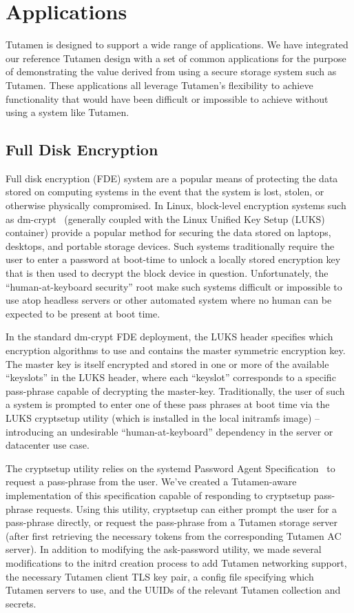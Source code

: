 \section{Applications}
\label{sec:apps}

Tutamen is designed to support a wide range of applications. We have
integrated our reference Tutamen design with a set of common
applications for the purpose of demonstrating the value derived from
using a secure storage system such as Tutamen. These applications all
leverage Tutamen's flexibility to achieve functionality that would
have been difficult or impossible to achieve without using a system
like Tutamen.

\subsection{Full Disk Encryption}

Full disk encryption (FDE) system are a popular means of protecting
the data stored on computing systems in the event that the system is
lost, stolen, or otherwise physically compromised. In Linux,
block-level encryption systems such as dm-crypt~\cite{dm-crypt}
(generally coupled with the Linux Unified Key Setup (LUKS)~\cite{luks}
container) provide a popular method for securing the data stored on
laptops, desktops, and portable storage devices. Such systems
traditionally require the user to enter a password at boot-time to
unlock a locally stored encryption key that is then used to decrypt
the block device in question. Unfortunately, the ``human-at-keyboard
security'' root make such systems difficult or impossible to use atop
headless servers or other automated system where no human can be
expected to be present at boot time.

In the standard dm-crypt FDE deployment, the LUKS header specifies
which encryption algorithms to use and contains the master symmetric
encryption key. The master key is itself encrypted and stored in one
or more of the available ``keyslots'' in the LUKS header, where each
``keyslot'' corresponds to a specific pass-phrase capable of
decrypting the master-key. Traditionally, the user of such a system is
prompted to enter one of these pass phrases at boot time via the LUKS
cryptsetup utility (which is installed in the local initramfs image)
-- introducing an undesirable ``human-at-keyboard'' dependency in the
server or datacenter use case.

The cryptsetup utility relies on the systemd Password Agent
Specification~\cite{systemd-passwordagents} to request a pass-phrase
from the user. We've created a Tutamen-aware implementation of this
specification capable of responding to cryptsetup pass-phrase
requests. Using this utility, cryptsetup can either prompt the user
for a pass-phrase directly, or request the pass-phrase from a Tutamen
storage server (after first retrieving the necessary tokens from the
corresponding Tutamen AC server). In addition to modifying the
ask-password utility, we made several modifications to the initrd
creation process to add Tutamen networking support, the necessary
Tutamen client TLS key pair, a config file specifying which
Tutamen servers to use, and the UUIDs of the relevant Tutamen
collection and secrets.

